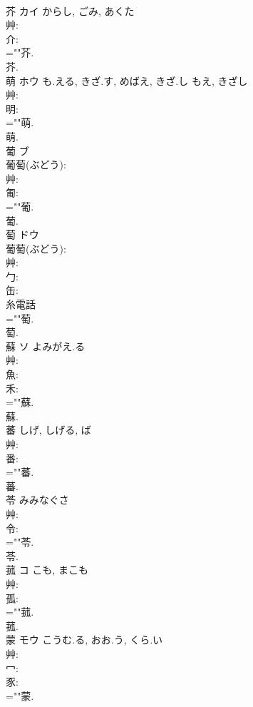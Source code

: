 \documentclass[8pt]{extreport}
\begin{document}
\begin{CJK}{UTF8}{min}
\\	芥	カイ	からし, ごみ, あくた		
\\	艸: 
\\	介: 
\\	=""芥.
\\	芥.
\\	萌	ホウ	も.える, きざ.す, めばえ, きざ.し	もえ, きざし	
\\	艸: 
\\	明: 
\\	=""萌.
\\	萌.
\\	葡	ブ			
\\	葡萄(ぶどう): 
\\	艸: 
\\	匍: 
\\	=""葡.
\\	葡.
\\	萄	ドウ			
\\	葡萄(ぶどう): 
\\	艸: 
\\	勹: 
\\	缶: 
\\	糸電話 
\\	=""萄.
\\	萄.
\\	蘇	ソ	よみがえ.る		
\\	艸: 
\\	魚: 
\\	禾: 
\\	=""蘇.
\\	蘇.
\\	蕃			しげ, しげる, ば			
\\	艸: 
\\	番: 
\\	=""蕃.
\\	蕃.
\\	苓		みみなぐさ				
\\	艸: 
\\	令: 
\\	=""苓.
\\	苓.
\\	菰	コ	こも, まこも		
\\	艸: 
\\	孤: 
\\	=""菰.
\\	菰.
\\	蒙	モウ	こうむ.る, おお.う, くら.い		
\\	艸: 
\\	冖: 
\\	豕: 
\\	=""蒙.

\end{CJK}
\end{document}
